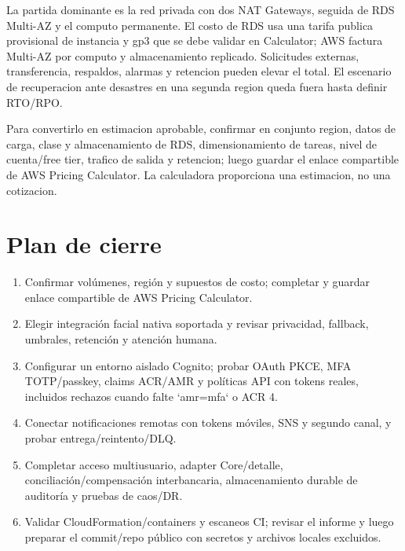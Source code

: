 \documentclass[11pt,a4paper]{report}
\begin{document}
La partida dominante es la red privada con dos NAT Gateways, seguida de RDS Multi-AZ y el computo permanente. El costo de RDS usa una tarifa publica provisional de instancia y gp3 que se debe validar en Calculator; AWS factura Multi-AZ por computo y almacenamiento replicado. Solicitudes externas, transferencia, respaldos, alarmas y retencion pueden elevar el total. El escenario de recuperacion ante desastres en una segunda region queda fuera hasta definir RTO/RPO.

Para convertirlo en estimacion aprobable, confirmar en conjunto region, datos de carga, clase y almacenamiento de RDS, dimensionamiento de tareas, nivel de cuenta/free tier, trafico de salida y retencion; luego guardar el enlace compartible de AWS Pricing Calculator. La calculadora proporciona una estimacion, no una cotizacion.

\chapter{Plan de cierre}
\begin{enumerate}
\item Confirmar volúmenes, región y supuestos de costo; completar y guardar enlace compartible de AWS Pricing Calculator.
\item Elegir integración facial nativa soportada y revisar privacidad, fallback, umbrales, retención y atención humana.
\item Configurar un entorno aislado Cognito; probar OAuth PKCE, MFA TOTP/passkey, claims ACR/AMR y políticas API con tokens reales, incluidos rechazos cuando falte `amr=mfa` o ACR 4.
\item Conectar notificaciones remotas con tokens móviles, SNS y segundo canal, y probar entrega/reintento/DLQ.
\item Completar acceso multiusuario, adapter Core/detalle, conciliación/compensación interbancaria, almacenamiento durable de auditoría y pruebas de caos/DR.
\item Validar CloudFormation/containers y escaneos CI; revisar el informe y luego preparar el commit/repo público con secretos y archivos locales excluidos.
\end{enumerate}
\end{document}
